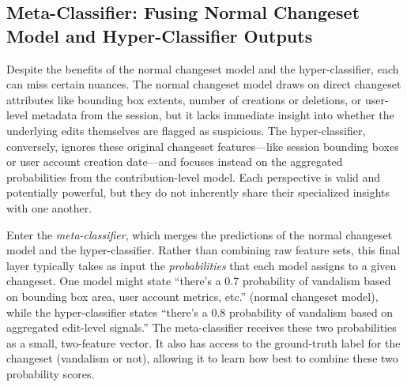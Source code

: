 \documentclass[
    13pt, %
    a4paper, %
    twoside, 
    DIV14, %
    listof=totoc, %
    bibliography=totoc, %
    index=totoc, %
    headsepline
]{scrreprt}
\begin{document}
\subsection{Meta-Classifier: Fusing Normal Changeset Model and Hyper-Classifier Outputs}
\label{sec:meta_classifier}

Despite the benefits of the normal changeset model and the hyper-classifier, each can miss certain nuances. The normal changeset model draws on direct changeset attributes like bounding box extents, number of creations or deletions, or user-level metadata from the session, but it lacks immediate insight into whether the underlying edits themselves are flagged as suspicious. The hyper-classifier, conversely, ignores these original changeset features—like session bounding boxes or user account creation date—and focuses instead on the aggregated probabilities from the contribution-level model. Each perspective is valid and potentially powerful, but they do not inherently share their specialized insights with one another.

Enter the \emph{meta-classifier}, which merges the predictions of the normal changeset model and the hyper-classifier. Rather than combining raw feature sets, this final layer typically takes as input the \emph{probabilities} that each model assigns to a given changeset. One model might state “there’s a 0.7 probability of vandalism based on bounding box area, user account metrics, etc.” (normal changeset model), while the hyper-classifier states “there’s a 0.8 probability of vandalism based on aggregated edit-level signals.” The meta-classifier receives these two probabilities as a small, two-feature vector. It also has access to the ground-truth label for the changeset (vandalism or not), allowing it to learn how best to combine these two probability scores.
\end{document}
